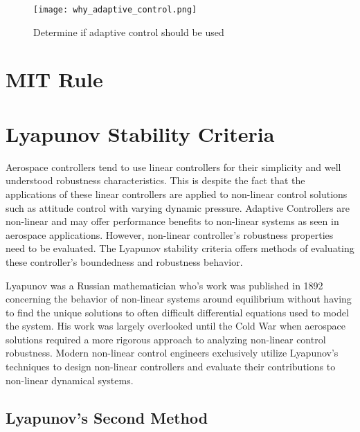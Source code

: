 \begin{figure}[h!]
 \centering
  \texttt{[image: why\_adaptive\_control.png]}
  \caption{Determine if adaptive control should be used}
  \label{fig:why_adaptive_control}
\end{figure}


\section{MIT Rule}


\section{Lyapunov Stability Criteria}

Aerospace controllers tend to use linear controllers for their simplicity and well understood robustness characteristics.  This is despite the fact that the applications of these linear controllers are applied to non-linear control solutions such as attitude control with varying dynamic pressure.  Adaptive Controllers are non-linear and may offer performance benefits to non-linear systems as seen in aerospace applications.  However, non-linear controller's robustness properties need to be evaluated.  The Lyapunov stability criteria offers methods of evaluating these controller's boundedness and robustness behavior.  

Lyapunov was a Russian mathematician who's work was published in 1892 concerning the behavior of non-linear systems around equilibrium without having to find the unique solutions to often difficult differential equations used to model the system.  His work was largely overlooked until the Cold War when aerospace solutions required a more rigorous approach to analyzing non-linear control robustness.  Modern non-linear control engineers exclusively utilize Lyapunov's techniques to design non-linear controllers and evaluate their contributions to non-linear dynamical systems.

\subsection{Lyapunov's Second Method}
 


